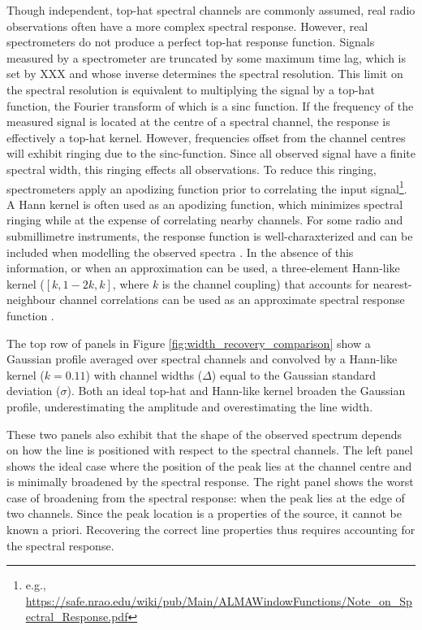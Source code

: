 \documentclass{rnaastex}
\begin{document}
Though independent, top-hat spectral channels are commonly assumed, real radio observations often have a more complex spectral response.
However, real spectrometers do not produce a perfect top-hat response function.  Signals measured by a spectrometer are truncated by some maximum time lag, which is set by XXX and whose inverse determines the spectral resolution.  This limit on the spectral resolution is equivalent to multiplying the signal by a top-hat function, the Fourier transform of which is a sinc function.  If the frequency of the measured signal is located at the centre of a spectral channel, the response is effectively a top-hat kernel.  However, frequencies offset from the channel centres will exhibit ringing due to the sinc-function.  Since all observed signal have a finite spectral width, this ringing effects all observations.  To reduce this ringing, spectrometers apply an apodizing function prior to correlating the input signal\footnote{e.g., \url{https://safe.nrao.edu/wiki/pub/Main/ALMAWindowFunctions/Note_on_Spectral_Response.pdf}}.  A Hann kernel is often used as an apodizing function, which minimizes spectral ringing while at the expense of correlating nearby channels.  For some radio and submillimetre instruments, the response function is well-charaxterized and can be included when modelling the observed spectra \citep{rosolowsky2008}.  In the absence of this information, or when an approximation can be used, a three-element Hann-like kernel ($[k, 1 - 2k, k]$, where $k$ is the channel coupling) that accounts for nearest-neighbour channel correlations can be used as an approximate spectral response function \citep{leroy2016}.

The top row of panels in Figure \ref{fig:width_recovery_comparison} show a Gaussian profile averaged over spectral channels and convolved by a Hann-like kernel ($k=0.11$) with channel widths ($\Delta$) equal to the Gaussian standard deviation ($\sigma$). Both an ideal top-hat and Hann-like kernel broaden the Gaussian profile, underestimating the amplitude and overestimating the line width.


These two panels also exhibit that the shape of the observed spectrum depends on how the line is positioned with respect to the spectral channels. The left panel shows the ideal case where the position of the peak lies at the channel centre and is minimally broadened by the spectral response.  The right panel shows the worst case of broadening from the spectral response: when the peak lies at the edge of two channels.  Since the peak location is a properties of the source, it cannot be known a priori.  Recovering the correct line properties thus requires accounting for the spectral response.
\end{document}
